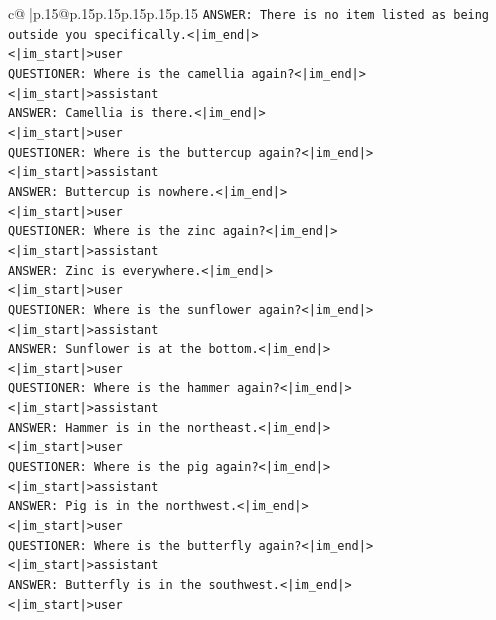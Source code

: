 \documentclass{article}
\begin{document}
{\begin{supertabular}{c@{$\;$}|p{.15\linewidth}@{}p{.15\linewidth}p{.15\linewidth}p{.15\linewidth}p{.15\linewidth}p{.15\linewidth}}
{{{\texttt{ANSWER: There is no item listed as being outside you specifically.<|im\_end|>} \\
\texttt{<|im\_start|>user} \\
\texttt{QUESTIONER: Where is the camellia again?<|im\_end|>} \\
\texttt{<|im\_start|>assistant} \\
\texttt{ANSWER: Camellia is there.<|im\_end|>} \\
\texttt{<|im\_start|>user} \\
\texttt{QUESTIONER: Where is the buttercup again?<|im\_end|>} \\
\texttt{<|im\_start|>assistant} \\
\texttt{ANSWER: Buttercup is nowhere.<|im\_end|>} \\
\texttt{<|im\_start|>user} \\
\texttt{QUESTIONER: Where is the zinc again?<|im\_end|>} \\
\texttt{<|im\_start|>assistant} \\
\texttt{ANSWER: Zinc is everywhere.<|im\_end|>} \\
\texttt{<|im\_start|>user} \\
\texttt{QUESTIONER: Where is the sunflower again?<|im\_end|>} \\
\texttt{<|im\_start|>assistant} \\
\texttt{ANSWER: Sunflower is at the bottom.<|im\_end|>} \\
\texttt{<|im\_start|>user} \\
\texttt{QUESTIONER: Where is the hammer again?<|im\_end|>} \\
\texttt{<|im\_start|>assistant} \\
\texttt{ANSWER: Hammer is in the northeast.<|im\_end|>} \\
\texttt{<|im\_start|>user} \\
\texttt{QUESTIONER: Where is the pig again?<|im\_end|>} \\
\texttt{<|im\_start|>assistant} \\
\texttt{ANSWER: Pig is in the northwest.<|im\_end|>} \\
\texttt{<|im\_start|>user} \\
\texttt{QUESTIONER: Where is the butterfly again?<|im\_end|>} \\
\texttt{<|im\_start|>assistant} \\
\texttt{ANSWER: Butterfly is in the southwest.<|im\_end|>} \\
\texttt{<|im\_start|>user} \\
}}}
\end{supertabular}}
\end{document}
